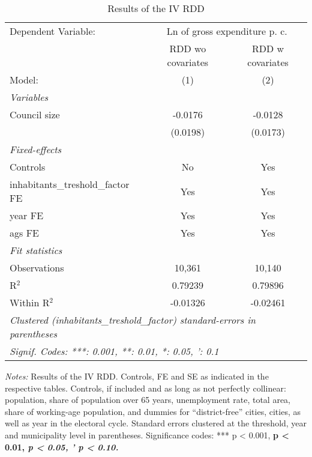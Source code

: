 
\begin{table}[htbp]
   \caption{\label{tab:rdd_iv} Results of the \ac{IV} \ac{RDD}}
   \centering
   \begin{tabular}{lcc}
      \tabularnewline \midrule \midrule
      Dependent Variable: & \multicolumn{2}{c}{Ln of gross expenditure p. c.}\\
                                               & \acs{RDD} \acs{wo} covariates   & \acs{RDD} \acs{w} covariates \\     
      Model:                                   & (1)                             & (2)\\  
      \midrule
      \emph{Variables}\\
      Council size                             & -0.0176                         & -0.0128\\   
                                               & (0.0198)                        & (0.0173)\\   
      \midrule
      \emph{Fixed-effects}\\
      Controls                                 & No                              & Yes\\  
      inhabitants\_treshold\_factor \ac{FE}    & Yes                             & Yes\\  
      year \ac{FE}                             & Yes                             & Yes\\  
      ags \ac{FE}                              & Yes                             & Yes\\  
      \midrule
      \emph{Fit statistics}\\
      Observations                             & 10,361                          & 10,140\\  
      R$^2$                                    & 0.79239                         & 0.79896\\  
      Within R$^2$                             & -0.01326                        & -0.02461\\  
      \midrule \midrule
      \multicolumn{3}{l}{\emph{Clustered (inhabitants\_treshold\_factor) standard-errors in parentheses}}\\
      \multicolumn{3}{l}{\emph{Signif. Codes: ***: 0.001, **: 0.01, *: 0.05, ': 0.1}}\\
   \end{tabular}
   
   \par \raggedright 
   \footnotesize{\textit{Notes:} Results of the \ac{IV} \ac{RDD}. Controls, \ac{FE} and \ac{SE} as indicated in the respective tables. Controls, if included and as long as not perfectly collinear: population, share of population over 65 years, unemployment rate, total area, share of working-age population, and dummies for ``district-free'' cities, cities, as well as year in the electoral cycle. Standard errors clustered at the threshold, year and municipality level in parentheses. Significance codes: *** p < 0.001, \textbf{ p < 0.01, \textit{ p < 0.05, ' p < 0.10.}}}
\end{table}


